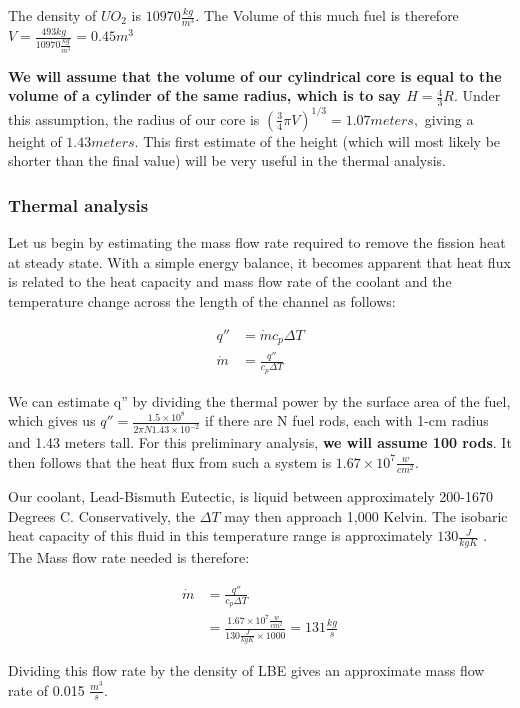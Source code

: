 \documentclass[12pt]{article}
\begin{document}
The density of $UO_2$ is $10970 \frac{kg}{m^3}$. The Volume of this much fuel is therefore $V = \frac{493 kg}{10970 \frac{kg}{m^3}} =  0.45 m ^ 3 $

\textbf{We will assume that the volume of our cylindrical core is equal to the volume of a cylinder of the same radius, which is to say $H = \frac{4}{3} R$}. Under this assumption, the radius of our core is $(\frac{3}{4} \pi V) ^ {1/3} = 1.07 meters,$ giving a height of $1.43 meters$. This first estimate of the height (which will most likely be shorter than the final value) will be very useful in the thermal analysis.   
\subsubsection{Thermal analysis}
Let us begin by estimating the mass flow rate required to remove the fission heat at steady state. With a simple energy balance, it becomes apparent that heat flux is related to the heat capacity and mass flow rate of the coolant and the temperature change across the length of the channel as follows:

\begin{align}
q'' &= \dot{m} c_p \Delta T \\
\dot{m} &= \frac{q''}{c_p \Delta T}
\end{align}

We can estimate q'' by dividing the thermal power by the surface area of the fuel, which gives us $q'' = \frac{1.5 \times 10^8}{2 \pi N 1.43 \times 10 ^{-2}}$ if there are N fuel rods, each with 1-cm radius and 1.43 meters tall. For this preliminary analysis, \textbf{we will assume 100 rods}. It then follows that the heat flux from such a system is $1.67 \times 10^7 \frac{w}{cm^2}$. 

Our coolant, Lead-Bismuth Eutectic, is liquid between approximately 200-1670 Degrees C. Conservatively, the $\Delta T$ may then approach 1,000 Kelvin. The isobaric heat capacity of this fluid in this temperature range is approximately $130 \frac{J}{kg K}$ \cite{LBE_properties}. The Mass flow rate needed is therefore:

\begin{align}
\dot{m} &= \frac{q''}{c_p \Delta T} \\
 &= \frac{1.67 \times 10^7 \frac{w}{cm^2}}{130 \frac{J}{kg K} \times 1000} = 131 \frac{kg}{s}
\end{align} 

Dividing this flow rate by the density of LBE gives an approximate mass flow rate of 0.015 $\frac{m^3}{s}$.
\end{document}
